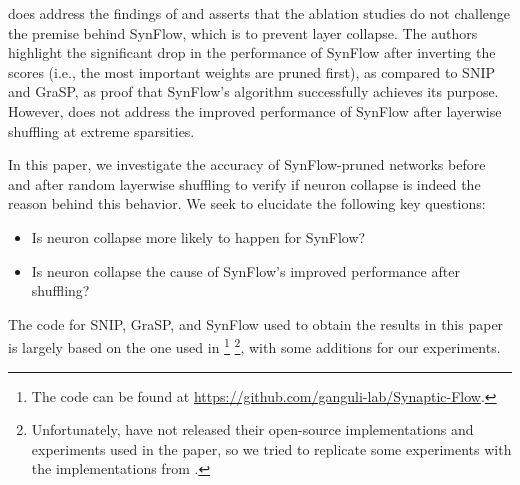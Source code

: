 \textcite{synflow20} does address the findings of \textcite{frankle21} and asserts that the ablation studies do not challenge the premise behind SynFlow, which is to prevent layer collapse. The authors highlight the significant drop in the performance of SynFlow after inverting the scores (i.e., the most important weights are pruned first), as compared to SNIP and GraSP, as proof that SynFlow's algorithm successfully achieves its purpose. However, \textcite{synflow20} does not address the improved performance of SynFlow after layerwise shuffling at extreme sparsities. 

In this paper, we investigate the accuracy of SynFlow-pruned networks before and after random layerwise shuffling to verify if neuron collapse is indeed the reason behind this behavior. We seek to elucidate the following key questions:
\begin{itemize}
    \item Is neuron collapse more likely to happen for SynFlow?
    \item Is neuron collapse the cause of SynFlow's improved performance after shuffling?
\end{itemize}
The code for SNIP, GraSP, and SynFlow used to obtain the results in this paper is largely based on the one used in \textcite{synflow20} \footnote{The code can be found at \url{https://github.com/ganguli-lab/Synaptic-Flow}.} \footnote{Unfortunately, \textcite{frankle21} have not released their open-source implementations and experiments used in the paper, so we tried to replicate some experiments with the implementations from \textcite{synflow20}.}, with some additions for our experiments.

